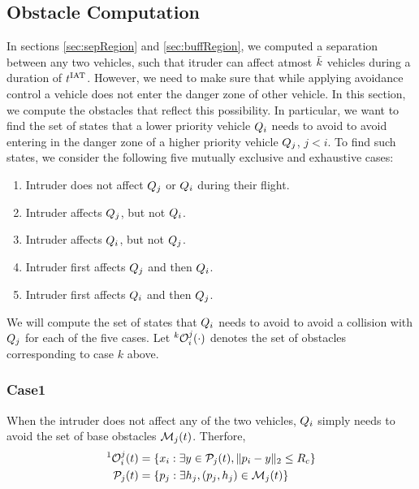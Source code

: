 \subsection{Obstacle Computation} \label{sec:intruderObs}

In sections \ref{sec:sepRegion} and \ref{sec:buffRegion}, we computed a separation between any two vehicles, such that itruder can affect atmost $\bar{k}$ vehicles during a duration of $t^\text{IAT}$. However, we need to make sure that while applying avoidance control a vehicle does not enter the danger zone of other vehicle. In this section, we compute the obstacles that reflect this possibility. In particular, we want to find the set of states that a lower priority vehicle $Q_i$ needs to avoid to avoid entering in the danger zone of a higher priority vehicle $Q_j$, $j < i$. To find such states, we consider the following five mutually exclusive and exhaustive cases:
\begin{enumerate}
\item Intruder does not affect $Q_j$ or $Q_i$ during their flight.
\item Intruder affects $Q_j$, but not $Q_i$.
\item Intruder affects $Q_i$, but not $Q_j$.
\item Intruder first affects $Q_j$ and then $Q_i$.
\item Intruder first affects $Q_i$ and then $Q_j$.
\end{enumerate}
We will compute the set of states that $Q_i$ needs to avoid to avoid a collision with $Q_j$ for each of the five cases. Let $^k\mathcal{O}_i^j(\cdot)$ denotes the set of obstacles corresponding to case $k$ above. 

\subsubsection{Case1} \label{sec:intruderObs_case1}
When the intruder does not affect any of the two vehicles, $Q_i$ simply needs to avoid the set of base obstacles $\mathcal{M}_j(t)$. Therfore, 
\begin{equation} \label{eq:intruderObs_case1}
\begin{aligned}
^1\ioset_i^j(t) & = \{\state_i: \exists y \in \pfrs_j(t), \|\pos_i - y\|_2 \le \rc \}\\
\pfrs_j(t) & = \{p_j: \exists \npos_j, (p_j, \npos_j) \in \boset_j(t) \}
\end{aligned}
\end{equation}


